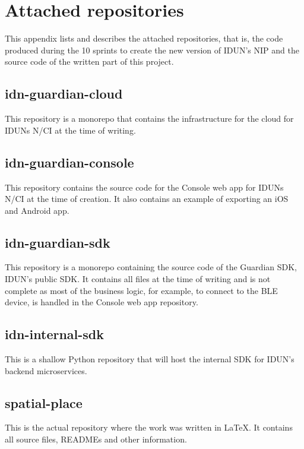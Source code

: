 \chapter{Attached repositories}
\label{appendix6-attached-repositories}

This appendix lists and describes the attached repositories, that is, the code produced during the 10 sprints to create the new version of IDUN’s NIP and the source code of the written part of this project.

\section*{idn-guardian-cloud}

This repository is a monorepo that contains the infrastructure for the cloud for IDUNs N/CI at the time of writing.

\section*{idn-guardian-console}

This repository contains the source code for the Console web app for IDUNs N/CI at the time of creation. It also contains an example of exporting an iOS and Android app.

\section*{idn-guardian-sdk}

This repository is a monorepo containing the source code of the Guardian SDK, IDUN’s public SDK. It contains all files at the time of writing and is not complete as most of the business logic, for example, to connect to the BLE device, is handled in the Console web app repository.

\section*{idn-internal-sdk}

This is a shallow Python repository that will host the internal SDK for IDUN’s backend microservices.

\section*{spatial-place}

This is the actual repository where the work was written in LaTeX. It contains all source files, READMEs and other information.
